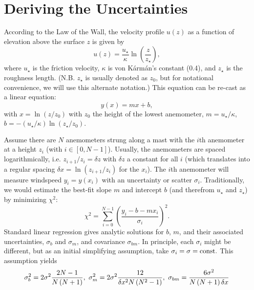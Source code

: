 \documentclass[linenumbers]{aastex631}
\begin{document}
\appendix
\section{Deriving the Uncertainties}

According to the Law of the Wall, the velocity profile $u(z)$ as a function of elevation above the surface $z$ is given by
\begin{equation}
    u(z) = \frac{u_\star}{\kappa} \ln \left( \frac{z}{z_\star} \right),\label{eqn:uz_profile}
\end{equation}
where $u_\star$ is the friction velocity, $\kappa$ is von K\'{a}rm\'{a}n's constant (0.4), and $z_\star$ is the roughness length. (N.B. $z_\star$ is usually denoted as $z_0$, but for notational convenience, we will use this alternate notation.) This equation can be re-cast as a linear equation:
\begin{equation}
    y(x) = m x + b,\label{eqn:linear_eqn}
\end{equation}
with $x = \ln \left( z/z_0 \right)$ with $z_0$ the height of the lowest anemometer, $m = u_\star/\kappa$, $b = -\left(u_\star/\kappa\right) \ln\left( z_\star/z_0 \right)$.

Assume there are $N$ anemometers strung along a mast with the $i$th anemometer at a height $z_i$ (with $i \in [0, N-1]$). Usually, the anemometers are spaced logarithmically, i.e. $z_{i+1}/z_i = \delta z$ with $\delta z$ a constant for all $i$ (which translates into a regular spacing $\delta x = \ln(z_{i+1}/z_i)$ for the $x_i$). The $i$th anemometer will measure windspeed $y_i = y(x_i)$ with an uncertainty or scatter $\sigma_i$. Traditionally, we would estimate the best-fit slope $m$ and intercept $b$ (and therefrom $u_\star$ and $z_\star$) by minimizing $\chi^2$:
\begin{equation}
    \chi^2 = \sum_{i=0}^{N-1} \left( \frac{y_i - b - m x_i}{\sigma_i} \right)^2.\label{eqn:chisq}
\end{equation}
Standard linear regression gives analytic solutions for $b$, $m$, and their associated uncertainties, $\sigma_b$ and $\sigma_m$, and covariance $\sigma_{bm}$. In principle, each $\sigma_i$ might be different, but as an initial simplifying assumption, take $\sigma_i = \sigma = {\rm const.}$ This assumption yields
\begin{equation}
    \sigma_b^2 = 2\sigma^2 \frac{2N - 1}{N\left(N + 1\right)},\ 
    \sigma_m^2 = 2\sigma^2 \frac{12}{\delta x^2 N \left( N^2 - 1 \right)},\ 
    \sigma_{bm} = \frac{6 \sigma^2}{N \left( N + 1\right) \delta x \label{eqn:sigma_b-and-sigma_m} }\\
\end{equation}
\end{document}
